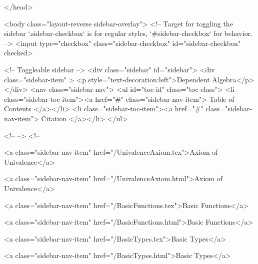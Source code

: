   
</head>




  <body class="layout-reverse sidebar-overlay">
    <!-- Target for toggling the sidebar `.sidebar-checkbox` is for regular
     styles, `#sidebar-checkbox` for behavior. -->
<input type="checkbox" class="sidebar-checkbox" id="sidebar-checkbox" checked>

<!-- Toggleable sidebar -->
<div class="sidebar" id="sidebar">
  <div class="sidebar-item" >
    <p style="text-decoration:left">Dependent Algebra</p>
  </div>
  <nav class="sidebar-nav">
    <ul id="toc-id" class="toc-class">
  <li class="sidebar-toc-item"><a href="#" class="sidebar-nav-item"> Table of Contents </a></li>
  <li class="sidebar-toc-item"><a href="#" class="sidebar-nav-item"> Citation </a></li>
</ul>


    <!--  -->
    <!-- 
      
    
      
    
      
    
      
    
      
        
      
    
      
        
          <a class="sidebar-nav-item" href="/UnivalenceAxiom.tex">Axiom of Univalence</a>
        
      
    
      
        
          <a class="sidebar-nav-item" href="/UnivalenceAxiom.html">Axiom of Univalence</a>
        
      
    
      
        
          <a class="sidebar-nav-item" href="/BasicFunctions.tex">Basic Functions</a>
        
      
    
      
        
          <a class="sidebar-nav-item" href="/BasicFunctions.html">Basic Functions</a>
        
      
    
      
        
          <a class="sidebar-nav-item" href="/BasicTypes.tex">Basic Types</a>
        
      
    
      
        
          <a class="sidebar-nav-item" href="/BasicTypes.html">Basic Types</a>
        
      
    
